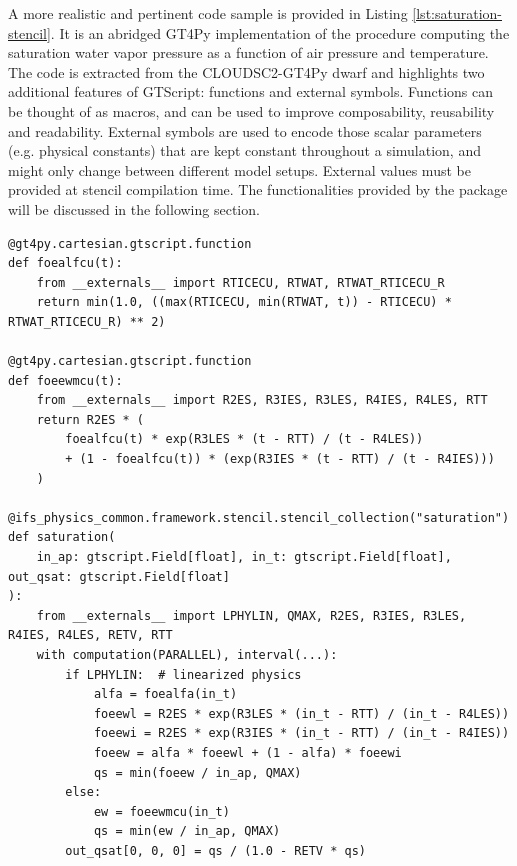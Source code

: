 \documentclass[main.tex]{subfiles}
\begin{document}
        A more realistic and pertinent code sample is provided in Listing \ref{lst:saturation-stencil}. It is an abridged GT4Py implementation of the procedure computing the saturation water vapor pressure as a function of air pressure and temperature. The code is extracted from the CLOUDSC2-GT4Py dwarf and highlights two additional features of GTScript: functions and external symbols. Functions can be thought of as macros, and can be used to improve composability, reusability and readability. External symbols are used to encode those scalar parameters (e.g. physical constants) that are kept constant throughout a simulation, and might only change between different model setups. External values must be provided at stencil compilation time. The functionalities provided by the package  will be discussed in the following section.

        \begin{listing}[t!]
            \begin{verbatim}
@gt4py.cartesian.gtscript.function
def foealfcu(t):
    from __externals__ import RTICECU, RTWAT, RTWAT_RTICECU_R
    return min(1.0, ((max(RTICECU, min(RTWAT, t)) - RTICECU) * RTWAT_RTICECU_R) ** 2)

@gt4py.cartesian.gtscript.function
def foeewmcu(t):
    from __externals__ import R2ES, R3IES, R3LES, R4IES, R4LES, RTT
    return R2ES * (
        foealfcu(t) * exp(R3LES * (t - RTT) / (t - R4LES))
        + (1 - foealfcu(t)) * (exp(R3IES * (t - RTT) / (t - R4IES)))
    )

@ifs_physics_common.framework.stencil.stencil_collection("saturation")
def saturation(
    in_ap: gtscript.Field[float], in_t: gtscript.Field[float], out_qsat: gtscript.Field[float]
):
    from __externals__ import LPHYLIN, QMAX, R2ES, R3IES, R3LES, R4IES, R4LES, RETV, RTT
    with computation(PARALLEL), interval(...):
        if LPHYLIN:  # linearized physics
            alfa = foealfa(in_t)
            foeewl = R2ES * exp(R3LES * (in_t - RTT) / (in_t - R4LES))
            foeewi = R2ES * exp(R3IES * (in_t - RTT) / (in_t - R4IES))
            foeew = alfa * foeewl + (1 - alfa) * foeewi
            qs = min(foeew / in_ap, QMAX)
        else:
            ew = foeewmcu(in_t)
            qs = min(ew / in_ap, QMAX)
        out_qsat[0, 0, 0] = qs / (1.0 - RETV * qs)
            \end{verbatim}

            \caption{GTScript (the Python-embedded DSL exposed by GT4Py) functions and stencil computing the saturation water vapor pressure given the air pressure and temperature. Abridged excerpt from the CLOUDSC2-GT4Py dwarf.}
            \label{lst:saturation-stencil}
        \end{listing}

    \biblio
\end{document}
